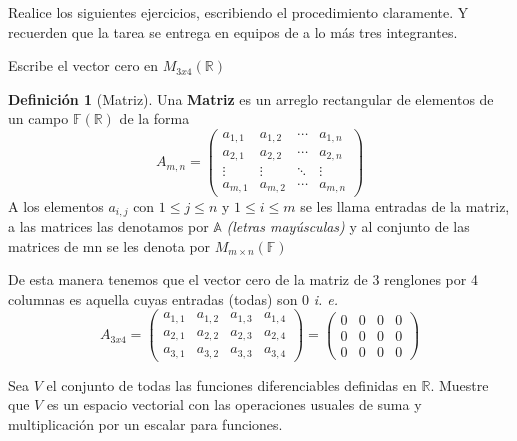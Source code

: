 \documentclass[letterpaper]{article}
\newcommand{\F}{\mathds{F}}
\newcommand{\R}{\mathds{R}}
\renewcommand{\*}{\cdot}
\theoremstyle{definition}
\newtheorem{definition}{Definición}
\begin{document}
	\noindent Realice los siguientes ejercicios, escribiendo el procedimiento claramente. Y recuerden que la tarea se entrega en equipos de a lo más tres integrantes. 
\begin{ejercicio}{1}
	Escribe el vector cero en $M_{3x4}(\mathbb{R})$
\end{ejercicio}
		\begin{definition}[Matriz]
		Una \textbf{Matriz} es un arreglo rectangular de elementos de un campo $ \F(\R) $ de la forma
		\begin{equation*}
		A_{m,n} = 
		\begin{pmatrix}
		a_{1,1} & a_{1,2} & \cdots & a_{1,n} \\
		a_{2,1} & a_{2,2} & \cdots & a_{2,n} \\
		\vdots  & \vdots  & \ddots & \vdots  \\
		a_{m,1} & a_{m,2} & \cdots & a_{m,n} 
		\end{pmatrix}
		\end{equation*}
		A los elementos $ a_{i,j} $ con $ 1 \leq j \leq n $ y $ 1 \leq i \leq m $ se les llama entradas de la matriz, a las matrices las denotamos por $ \mathds{A} $ 				\textit{(letras mayúsculas)} y al conjunto de las matrices de mn se les denota por $ M_{m\times n}(\F) $
		
	\end{definition}
	De esta manera tenemos que el vector cero de la matriz de 3 renglones por 4 columnas es aquella cuyas entradas (todas) son 0 \textit{i. e. }
		\begin{equation*}
		A_{3x4} = 
		\begin{pmatrix}
		a_{1,1} & a_{1,2} & a_{1,3} & a_{1,4} \\
		a_{2,1} & a_{2,2} & a_{2,3} & a_{2,4} \\
		a_{3,1} & a_{3,2} & a_{3,3} & a_{3,4} 
		\end{pmatrix}
		= 
		\begin{pmatrix}
		0 & 0 & 0 & 0\\
		0 & 0 & 0 & 0 \\
		0 & 0 & 0 & 0
		\end{pmatrix}
		\end{equation*}
		
\begin{ejercicio}{2}
 Sea $V$ el conjunto de todas las funciones diferenciables definidas en $\mathbb{R}$. Muestre que $V$ es un espacio vectorial con las operaciones usuales de suma y multiplicación por un escalar para funciones. 
\end{ejercicio}
\end{document}
